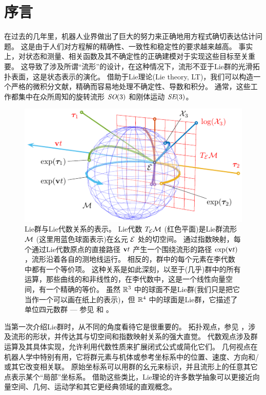 
\section{序言}
\label{sec:intro}

在过去的几年里，机器人业界做出了巨大的努力来正确地用方程式确切表达估计问题。 
这是由于人们对方程解的精确性、一致性和稳定性的要求越来越高。 
事实上，对状态和测量、相关函数及其不确定性的正确建模对于实现这些目标至关重要。
这导致了涉及所谓“流形”的设计，在这种情况下，流形不亚于Lie群的光滑拓扑表面，这是状态表示的演化。
借助于Lie理论(Lie theory, LT)，我们可以构造一个严格的微积分文献，精确而容易地处理不确定性、导数和积分。
通常，这些工作都集中在众所周知的旋转流形 $\textit{SO}(3)$ 和刚体运动 $\textit{SE}(3)$。

\begin{figure}[tb]
\centering
\includegraphics{figures/exponential}
\caption{Lie群与Lie代数关系的表示。
Lie代数 $T_{\mathcal{E}}{\mathcal{M}}$ (红色平面)是Lie群流形 $\mathcal{M}$ (这里用蓝色球面表示)在幺元 $\mathcal{E}$ 处的切空间。
通过指数映射，每个通过Lie代数原点的直接路径 ${\bf v} t$ 产生一个围绕流形的路径 $\exp({\bf v} t)$ ，流形沿着各自的测地线运行。 
相反的，群中的每个元素在李代数中都有一个等价项。
这种关系是如此深刻，以至于(几乎)群中的所有运算，那些曲线的和非线性的，在李代数中，这是一个线性向量空间，有一个精确的等价。
虽然 ${\mathbb R}^3$ 中的球面不是Lie群(我们只是把它当作一个可以画在纸上的表示)，但 ${\mathbb R}^4$ 中的球面是Lie群，它描述了单位四元数群 --- 参见  和  。
}
\label{fig:exponential}
\end{figure}

当第一次介绍Lie群时，从不同的角度看待它是很重要的。 
拓扑观点，参见  ，涉及流形的形状，并传达其与切空间和指数映射关系的强大直觉。
代数观点涉及群运算及其具体实现，允许利用代数性质来扩展闭式公式或简化它们。
几何视点在机器人学中特别有用，它将群元素与机体或参考坐标系中的位置、速度、方向和/或其它改变相关联。
原始坐标系可以用群的幺元来标识，并且流形上的任意其它点表示某个“局部”坐标系。
借助这些类比，Lie理论的许多数学抽象可以更接近向量空间、几何、运动学和其它更经典领域的直观概念。


